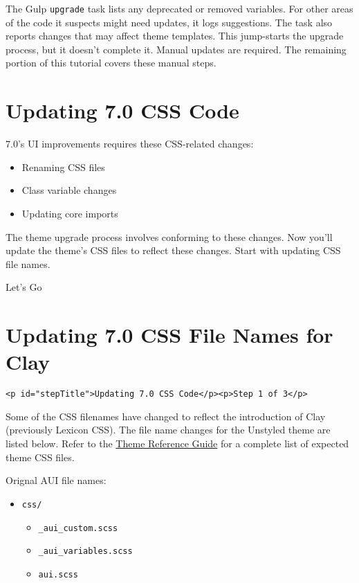 The Gulp \texttt{upgrade} task lists any deprecated or removed
variables. For other areas of the code it suspects might need updates,
it logs suggestions. The task also reports changes that may affect theme
templates. This jump-starts the upgrade process, but it doesn't complete
it. Manual updates are required. The remaining portion of this tutorial
covers these manual steps.

\chapter{Updating 7.0 CSS Code}\label{updating-7.0-css-code}

7.0's UI improvements requires these CSS-related changes:

\begin{itemize}
\tightlist
\item
  Renaming CSS files
\item
  Class variable changes
\item
  Updating core imports
\end{itemize}

The theme upgrade process involves conforming to these changes. Now
you'll update the theme's CSS files to reflect these changes. Start with
updating CSS file names.

Let's Go{}

\chapter{Updating 7.0 CSS File Names for
Clay}\label{updating-7.0-css-file-names-for-clay}

\begin{verbatim}
<p id="stepTitle">Updating 7.0 CSS Code</p><p>Step 1 of 3</p>
\end{verbatim}

Some of the CSS filenames have changed to reflect the introduction of
Clay (previously Lexicon CSS). The file name changes for the Unstyled
theme are listed below. Refer to the
\href{/docs/7-2/reference/-/knowledge_base/r/theme-reference-guide}{Theme
Reference Guide} for a complete list of expected theme CSS files.

Orignal AUI file names:

\begin{itemize}
\tightlist
\item
  \texttt{css/}

  \begin{itemize}
  \tightlist
  \item
    \texttt{\_aui\_custom.scss}
  \item
    \texttt{\_aui\_variables.scss}
  \item
    \texttt{aui.scss}
  \end{itemize}
\end{itemize}

